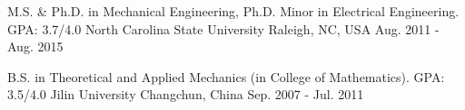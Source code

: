 

\begin{cventries}



\cventrysum
    {M.S. \& Ph.D. in Mechanical Engineering, Ph.D. Minor in Electrical Engineering. GPA: 3.7/4.0} %
    {North Carolina State University} %
    {Raleigh, NC, USA} %
    {Aug. 2011 -  Aug. 2015} %
    
\cventrysum
    {B.S. in Theoretical and Applied Mechanics (in College of Mathematics). GPA: 3.5/4.0} %
    {Jilin University} %
    {Changchun, China} %
    {Sep. 2007 -  Jul. 2011} %

\end{cventries}
